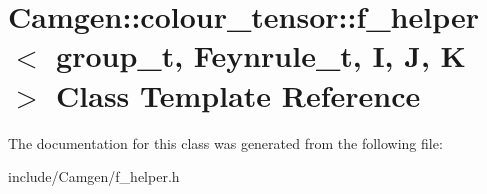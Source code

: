 \hypertarget{a00219}{}\section{Camgen\+:\+:colour\+\_\+tensor\+:\+:f\+\_\+helper$<$ group\+\_\+t, Feynrule\+\_\+t, I, J, K $>$ Class Template Reference}
\label{a00219}


The documentation for this class was generated from the following file\+:\begin{DoxyCompactItemize}
\item 
include/\+Camgen/f\+\_\+helper.\+h\end{DoxyCompactItemize}
